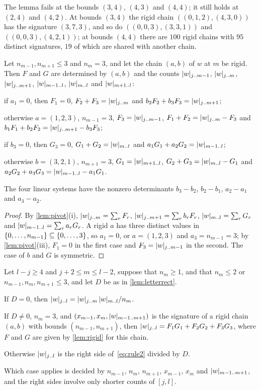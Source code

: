 \documentclass[11pt,a4paper]{article}
\begin{document}
The lemma fails at the bounds $(3,4)$, $(4,3)$ and $(4,4)$; it still holds at $(2,4)$ and $(4,2)$. At bounds $(3,4)$ the rigid chain $((0,1,2),(4,3,0))$ has the signature $(3,7,3)$, and so do $((0,0,3),(3,3,1))$ and $((0,0,3),(4,2,1))$; at bounds $(4,4)$ there are $100$ rigid chains with $95$ distinct signatures, $19$ of which are shared with another chain.

\begin{lemma}\label{lem:rigid}
Let $n_{m-1},n_{m+1}\le3$ and $n_m=3$, and let the chain $(a,b)$ of $w$ at $m$ be rigid. Then $F$ and $G$ are determined by $(a,b)$ and the counts $\lvert w\rvert_{j\mathinner{\ldotp\ldotp} m-1}$, $\lvert w\rvert_{j\mathinner{\ldotp\ldotp} m}$, $\lvert w\rvert_{j\mathinner{\ldotp\ldotp} m+1}$, $\lvert w\rvert_{m-1\mathinner{\ldotp\ldotp} l}$, $\lvert w\rvert_{m\mathinner{\ldotp\ldotp} l}$ and $\lvert w\rvert_{m+1\mathinner{\ldotp\ldotp} l}$:
\begin{parts}
\item if $a_1=0$, then $F_1=0$, $F_2+F_3=\lvert w\rvert_{j\mathinner{\ldotp\ldotp} m}$ and $b_2F_2+b_3F_3=\lvert w\rvert_{j\mathinner{\ldotp\ldotp} m+1}$;
\item otherwise $a=(1,2,3)$, $n_{m-1}=3$, $F_3=\lvert w\rvert_{j\mathinner{\ldotp\ldotp} m-1}$, $F_1+F_2=\lvert w\rvert_{j\mathinner{\ldotp\ldotp} m}-F_3$ and $b_1F_1+b_2F_2=\lvert w\rvert_{j\mathinner{\ldotp\ldotp} m+1}-b_3F_3$;
\item if $b_3=0$, then $G_3=0$, $G_1+G_2=\lvert w\rvert_{m\mathinner{\ldotp\ldotp} l}$ and $a_1G_1+a_2G_2=\lvert w\rvert_{m-1\mathinner{\ldotp\ldotp} l}$;
\item otherwise $b=(3,2,1)$, $n_{m+1}=3$, $G_1=\lvert w\rvert_{m+1\mathinner{\ldotp\ldotp} l}$, $G_2+G_3=\lvert w\rvert_{m\mathinner{\ldotp\ldotp} l}-G_1$ and $a_2G_2+a_3G_3=\lvert w\rvert_{m-1\mathinner{\ldotp\ldotp} l}-a_1G_1$.
\end{parts}
The four linear systems have the nonzero determinants $b_3-b_2$, $b_2-b_1$, $a_2-a_1$ and $a_3-a_2$.
\end{lemma}

\begin{proof}
By \cref{lem:pivot}(i), $\lvert w\rvert_{j\mathinner{\ldotp\ldotp} m}=\sum_rF_r$, $\lvert w\rvert_{j\mathinner{\ldotp\ldotp} m+1}=\sum_rb_rF_r$, $\lvert w\rvert_{m\mathinner{\ldotp\ldotp} l}=\sum_rG_r$ and $\lvert w\rvert_{m-1\mathinner{\ldotp\ldotp} l}=\sum_ra_rG_r$. A rigid $a$ has three distinct values in $\{0,\ldots,n_{m-1}\}\subseteq\{0,\ldots,3\}$, so $a_1=0$, or $a=(1,2,3)$ and $a_3=n_{m-1}=3$; by \cref{lem:pivot}(iii), $F_1=0$ in the first case and $F_3=\lvert w\rvert_{j\mathinner{\ldotp\ldotp} m-1}$ in the second. The case of $b$ and $G$ is symmetric.
\end{proof}

\begin{theorem}\label{thm:pivot}
Let $l-j\ge4$ and $j+2\le m\le l-2$, suppose that $n_m\ge1$, and that $n_m\le2$ or $n_{m-1},n_m,n_{m+1}\le3$, and let $D$ be as in \cref{lem:letterrect}.
\begin{parts}
\item If $D=0$, then $\lvert w\rvert_{j\mathinner{\ldotp\ldotp} l}=\lvert w\rvert_{j\mathinner{\ldotp\ldotp} m}\,\lvert w\rvert_{m\mathinner{\ldotp\ldotp} l}/n_m$.
\item If $D\ne0$, $n_m=3$, and $(x_{m-1},x_m,\lvert w\rvert_{m-1\mathinner{\ldotp\ldotp} m+1})$ is the signature of a rigid chain $(a,b)$ with bounds $(n_{m-1},n_{m+1})$, then $\lvert w\rvert_{j\mathinner{\ldotp\ldotp} l}=F_1G_1+F_2G_2+F_3G_3$, where $F$ and $G$ are given by \cref{lem:rigid} for this chain.
\item Otherwise $\lvert w\rvert_{j\mathinner{\ldotp\ldotp} l}$ is the right side of~\eqref{eq:rule2} divided by $D$.
\end{parts}
Which case applies is decided by $n_{m-1}$, $n_m$, $n_{m+1}$, $x_{m-1}$, $x_m$ and $\lvert w\rvert_{m-1\mathinner{\ldotp\ldotp} m+1}$, and the right sides involve only shorter counts of $[j,l]$.
\end{theorem}
\end{document}

